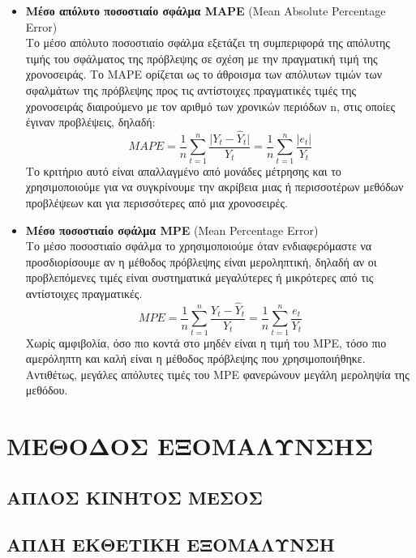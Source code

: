 \begin{itemize}
\item \textbf{Μέσο απόλυτο ποσοστιαίο σφάλμα MAPE} (Mean Absolute Percentage
Error)\\
Το μέσο απόλυτο ποσοστιαίο σφάλμα εξετάζει τη συμπεριφορά της απόλυτης
τιμής του σφάλματος της πρόβλεψης σε σχέση με την πραγματική τιμή της
χρονοσειράς. Το MAPE ορίζεται ως το άθροισμα των απόλυτων τιμών των
σφαλμάτων της πρόβλεψης προς τις αντίστοιχες πραγματικές τιμές της χρονοσειράς
διαιρούμενο με τον αριθμό των χρονικών περιόδων n, στις οποίες έγιναν προβλέψεις,
δηλαδή:\\
$$MAPE= \frac{1}{n} \sum_{t=1}^n \frac{\vert Y_t-\widehat{Y}_t \vert}{Y_t}=\frac{1}{n}\sum_{t=1}^n \frac{\vert e_t \vert}{Y_t} $$
Το κριτήριο αυτό είναι απαλλαγμένο από μονάδες μέτρησης και το
χρησιμοποιούμε για να συγκρίνουμε την ακρίβεια μιας ή περισσοτέρων μεθόδων
προβλέψεων και για περισσότερες από μια χρονοσειρές.

\item \textbf{Μέσο ποσοστιαίο σφάλμα MPE} (Mean Percentage Error)\\
Το μέσο ποσοστιαίο σφάλμα το χρησιμοποιούμε όταν ενδιαφερόμαστε να
προσδιορίσουμε αν η μέθοδος πρόβλεψης είναι μεροληπτική, δηλαδή αν οι
προβλεπόμενες τιμές είναι συστηματικά μεγαλύτερες ή μικρότερες από τις
αντίστοιχες πραγματικές.\\
$$ MPE= \frac{1}{n} \sum_{t=1}^n \frac{Y_t-\widehat{Y}_t}{Y_t} =\frac{1}{n} \sum_{t=1}^n \frac{e_t}{Y_t}$$
Χωρίς αμφιβολία, όσο πιο κοντά στο μηδέν είναι η τιμή του MPE, τόσο πιο
αμερόληπτη και καλή είναι η μέθοδος πρόβλεψης που χρησιμοποιήθηκε. Αντιθέτως,
μεγάλες απόλυτες τιμές του MPE φανερώνουν μεγάλη μεροληψία της μεθόδου.


\end{itemize}


\section{ΜΕΘΟΔΟΣ ΕΞΟΜΑΛΥΝΣΗΣ}


\subsection{ΑΠΛΟΣ ΚΙΝΗΤΟΣ ΜΕΣΟΣ}
\subsection{ ΑΠΛΗ ΕΚΘΕΤΙΚΗ ΕΞΟΜΑΛΥΝΣΗ}

